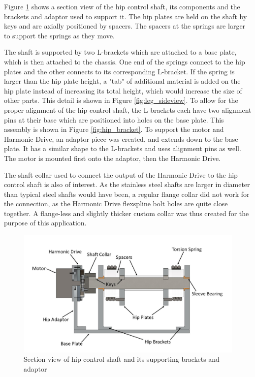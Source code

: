 Figure \ref{fig:shaft_hip} shows a section view of the hip control shaft, its components and the brackets and adaptor used to support it. The hip plates are held on the shaft by keys and are axially positioned by spacers. The spacers at the springs are larger to support the springs as they move. 

The shaft is supported by two L-brackets which are attached to a base plate, which is then attached to the chassis. One end of the springs connect to the hip plates and the other connects to its corresponding L-bracket. If the spring is larger than the hip plate height, a "tab" of additional material is added on the hip plate instead of increasing its total height, which would increase the size of other parts. This detail is shown in Figure \ref{fig:leg_sideview}.
To allow for the proper alignment of the hip control shaft, the L-brackets each have two alignment pins at their base which are positioned into holes on the base plate. This assembly is shown in Figure \ref{fig:hip_bracket}. To support the motor and Harmonic Drive, an adaptor piece was created, and extends down to the base plate. It has a similar shape to the L-brackets and uses alignment pins as well. The motor is mounted first onto the adaptor, then the Harmonic Drive.

The shaft collar used to connect the output of the Harmonic Drive to the hip control shaft is also of interest. As the stainless steel shafts are larger in diameter than typical steel shafts would have been, a regular flange collar did not work for the connection, as the Harmonic Drive flexspline bolt holes are quite close together. A flange-less and slightly thicker custom collar was thus created for the purpose of this application.

\begin{figure}
    \centering
    \includegraphics[width=\textwidth]{2_ProposedDesign/img/SectionHipShaftA.jpg}
    \caption{Section view of hip control shaft and its supporting brackets and adaptor}
    \label{fig:shaft_hip}
\end{figure}

